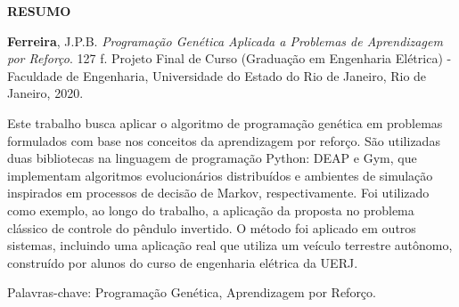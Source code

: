 \begin{center}
\textbf{RESUMO}
\end{center}

%
%

$\!$\\

\hspace{-1.3cm}\textbf{Ferreira}, J.P.B. \textit{Programação Genética Aplicada a Problemas de Aprendizagem por Reforço}. 127 f. Projeto Final de Curso (Graduação em Engenharia Elétrica) - Faculdade de Engenharia, Universidade do Estado do Rio de Janeiro, Rio de Janeiro, 2020.

\vspace{.2cm}

Este trabalho busca aplicar o algoritmo de programação genética em problemas formulados com base nos conceitos da aprendizagem por reforço. São utilizadas duas bibliotecas na linguagem de programação Python: DEAP e Gym, que implementam algoritmos evolucionários distribuídos e ambientes de simulação inspirados em processos de decisão de Markov, respectivamente. Foi utilizado como exemplo, ao longo do trabalho, a aplicação da proposta no problema clássico de controle do pêndulo invertido. O método foi aplicado em outros sistemas, incluindo uma aplicação real que utiliza um veículo terrestre autônomo, construído por alunos do curso de engenharia elétrica da UERJ.

\vspace{1cm}

\hspace{-1.3cm}Palavras-chave: Programação Genética, Aprendizagem por Reforço.